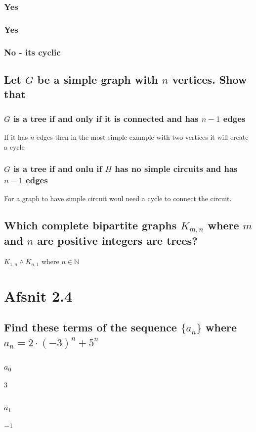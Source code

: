 \documentclass[12pt, a4paper]{report}
\begin{document}
					\subsubsection{Yes}
					\setcounter{subsubsection}{4}
					\subsubsection{Yes}
					\subsubsection{No - its cyclic}
				\setcounter{subsection}{14}
				\subsection{Let $G$ be a simple graph with $n$ vertices. Show that}
					\subsubsection{$G$ is a tree if and only if it is connected and has $n-1$ edges}
						If it has $n$ edges then in the most simple example with two vertices it will create a cycle
					\subsubsection{$G$ is a tree if and onlu if $H$ has no simple circuits and has $n-1$ edges}
						For a graph to have simple circuit woul need a cycle to connect the circuit.
				\subsection{Which complete bipartite graphs $K_{m,n}$ where $m$ and $n$ are positive integers are trees?}
				$K_{1,n}\land K_{n,1}$ where $n\in\mathbb{N}$
			\setcounter{section}{0}
			\section{Afsnit 2.4}
				\subsection{Find these terms of the sequence $\{a_n\}$ where $a_n=2\cdot(-3)^n+5^n$}
					\subsubsection{$a_0$}
						$3$
					\subsubsection{$a_1$}
						$-1$
\end{document}
